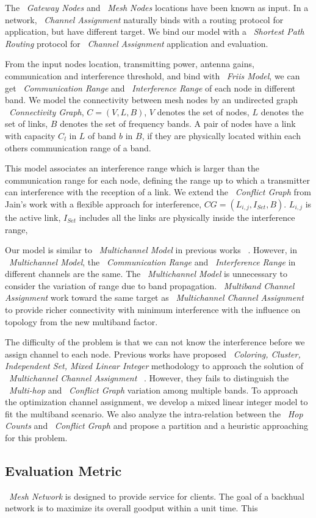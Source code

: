 The ~\emph{Gateway Nodes} and ~\emph{Mesh Nodes} locations have been known as input. In a network, ~\emph{Channel Assignment} naturally binds with a routing protocol for application, but have different target. We bind our model with a ~\emph{Shortest Path Routing} protocol for ~\emph{Channel Assignment} application and evaluation.

From the input nodes location, transmitting power, antenna gains, communication and interference threshold, and bind with ~\emph{Friis Model}, we can get ~\emph{Communication Range} and ~\emph{Interference Range} of each node in different band. 
We model the connectivity between mesh nodes by an undirected graph ~\emph{Connectivity Graph}, $C=(V,L,B)$, $V$ denotes the set of nodes, $L$ denotes the set of links, $B$ denotes the set of frequency bands. A pair of nodes have a link with capacity $C_l$ in $L$ of band $b$ in $B$, if they are physically located within each others communication range of a band. 

This model associates an interference range which is larger than the communication range for each node, defining the range up to which a transmitter can interference with the reception of a link. We extend the ~\emph{Conflict Graph} from Jain's work with a flexible approach for interference, $CG=(L_{i,j},I_{Set},B)$. $L_{i,j}$ is the active link, $I_{Set}$ includes all the links are physically inside the interference range, 

Our model is similar to ~\emph{Multichannel Model} in previous works ~\cite{tang2005interference,yuan2006cross,si2010overview}. However, in ~\emph{Multichannel Model}, the ~\emph{Communication Range} and ~\emph{Interference Range} in different channels are the same. The ~\emph{Multichannel Model} is unnecessary to consider the variation of range due to band propagation.
~\emph{Multiband Channel Assignment} work toward the same target as ~\emph{Multichannel Channel Assignment} to provide richer connectivity with minimum interference with the influence on topology from the new multiband factor.

The difficulty of the problem is that we can not know the interference before we assign channel to each node. Previous works have proposed ~\emph{Coloring, Cluster, Independent Set, Mixed Linear Integer} methodology to approach the solution of ~\emph{Multichannel Channel Assignment} ~\cite{mishra2005weighted,peng2012efficient,tang2005interference}. 
However, they fails to distinguish the ~\emph{Multi-hop} and ~\emph{Conflict Graph} variation among multiple bands.
To approach the optimization channel assignment, we develop a mixed linear integer model to fit the multiband scenario. We also analyze the intra-relation between the ~\emph{Hop Counts} and ~\emph{Conflict Graph} and propose a partition and a heuristic approaching for this problem.

\subsection{Evaluation Metric}
\label{subsec:metric}
~\emph{Mesh Network} is designed to provide service for clients. The goal of a backhual network is to maximize its overall goodput within a unit time. This 

